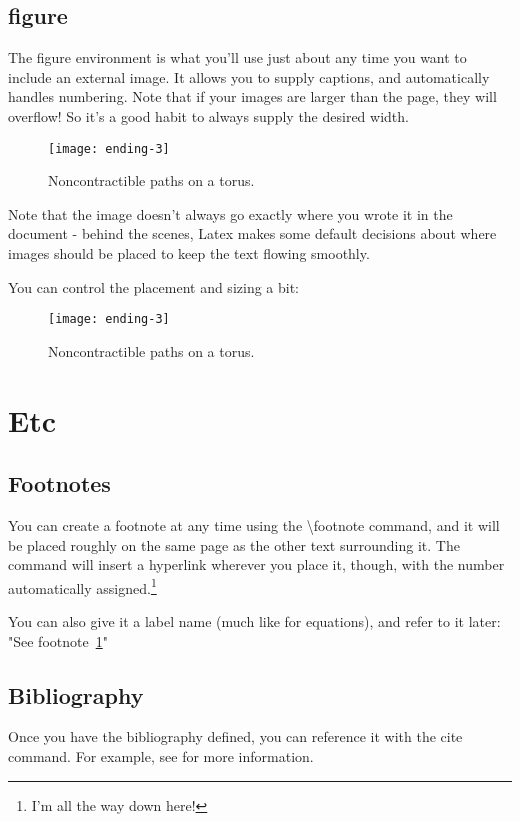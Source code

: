 \documentclass{article}
\begin{document}
    \subsection{figure}
        The figure environment is what you'll use just about any time you want to include an external image. It allows you to supply captions, and automatically handles numbering. Note that if your images are larger than the page, they will overflow! So it's a good habit to always supply the desired width.

        \begin{figure}
          \caption{Noncontractible paths on a torus.}
            \texttt{[image: ending-3]}
        \end{figure}

        Note that the image doesn't always go exactly where you wrote it in the document - behind the scenes, Latex makes some default decisions about where images should be placed to keep the text flowing smoothly.

        You can control the placement and sizing a bit:
        \begin{figure}[h] %
        \centering
          \caption{Noncontractible paths on a torus.}
            \texttt{[image: ending-3]}
        \end{figure}


\section{Etc}

    \subsection{Footnotes}
        You can create a footnote at any time using the \textbackslash footnote command, and it will be placed roughly on the same page as the other text surrounding it. The command will insert a hyperlink wherever you place it, though, with the number automatically assigned.\footnote{\label{myFootnoteName}I'm all the way down here!}

        You can also give it a label name (much like for equations), and refer to it later: "See footnote~\ref{myFootnoteName}"

    \newpage

    \subsection{Bibliography}
    Once you have the bibliography defined, you can reference it with the cite command. For example, see \cite{sourceName2} for more information.
\end{document}

